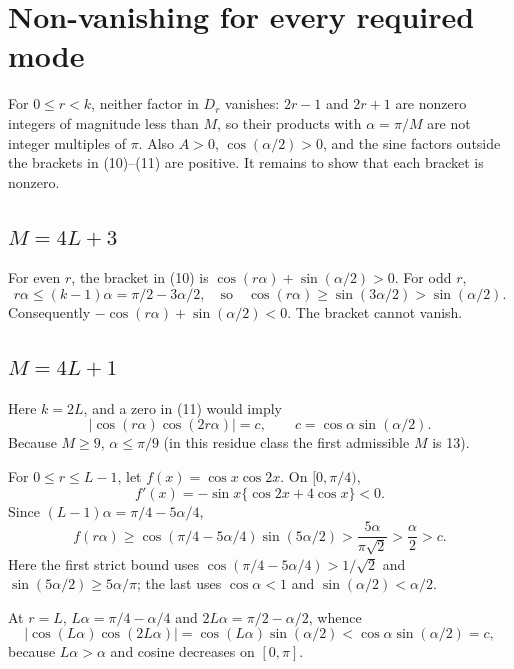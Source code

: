 \documentclass[11pt]{article}
\begin{document}
\section{Non-vanishing for every required mode}

For $0\leq r<k$, neither factor in $D_r$ vanishes: $2r-1$ and $2r+1$ are nonzero integers of magnitude less than $M$, so their products with $\alpha=\pi/M$ are not integer multiples of $\pi$. Also $A>0$, $\cos(\alpha/2)>0$, and the sine factors outside the brackets in (10)--(11) are positive. It remains to show that each bracket is nonzero.

\subsection{$M=4L+3$}
For even $r$, the bracket in (10) is $\cos(r\alpha)+\sin(\alpha/2)>0$. For odd $r$,
\[
 r\alpha\leq(k-1)\alpha=\pi/2-3\alpha/2,
 \quad\text{so}\quad
 \cos(r\alpha)\geq\sin(3\alpha/2)>\sin(\alpha/2).
\]
Consequently $-\cos(r\alpha)+\sin(\alpha/2)<0$. The bracket cannot vanish.

\subsection{$M=4L+1$}
Here $k=2L$, and a zero in (11) would imply
\[
 |\cos(r\alpha)\cos(2r\alpha)|=c,
 \qquad c=\cos\alpha\sin(\alpha/2). \tag{12}
\]
Because $M\geq9$, $\alpha\leq\pi/9$ (in this residue class the first admissible $M$ is 13).

For $0\leq r\leq L-1$, let $f(x)=\cos x\cos2x$. On $[0,\pi/4)$,
\[
 f'(x)=-\sin x\{\cos2x+4\cos x\}<0.
\]
Since $(L-1)\alpha=\pi/4-5\alpha/4$,
\[
 f(r\alpha)\geq
 \cos(\pi/4-5\alpha/4)\sin(5\alpha/2)
 >\frac{5\alpha}{\pi\sqrt2}>\frac\alpha2>c. \tag{13}
\]
Here the first strict bound uses $\cos(\pi/4-5\alpha/4)>1/\sqrt2$ and $\sin(5\alpha/2)\geq5\alpha/\pi$; the last uses $\cos\alpha<1$ and $\sin(\alpha/2)<\alpha/2$.

At $r=L$, $L\alpha=\pi/4-\alpha/4$ and $2L\alpha=\pi/2-\alpha/2$, whence
\[
 |\cos(L\alpha)\cos(2L\alpha)|
 =\cos(L\alpha)\sin(\alpha/2)<\cos\alpha\sin(\alpha/2)=c, \tag{14}
\]
because $L\alpha>\alpha$ and cosine decreases on $[0,\pi]$.
\end{document}

